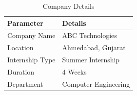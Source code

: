 
\begin{table}[H]
    \centering

    \caption{Company Details}
    \label{tab:company-details}

    \begin{tabular}{|p{}|p{}|}
        \hline

        \textbf{Parameter} &
        \textbf{Details}
        \\ \hline

        Company Name &
        ABC Technologies
        \\ \hline

        Location &
        Ahmedabad, Gujarat
        \\ \hline

        Internship Type &
        Summer Internship
        \\ \hline

        Duration &
        4 Weeks
        \\ \hline

        Department &
        Computer Engineering
        \\ \hline

    \end{tabular}

\end{table}